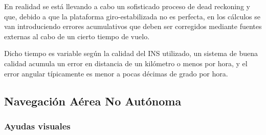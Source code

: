\documentclass[a4paper,12pt,twoside]{article}
\begin{document}
\begin{description}











En realidad se est\'a llevando a cabo un sofisticado proceso de dead reckoning  y que, debido a que la plataforma giro-estabilizada no es perfecta, en los c\'alculos se van introduciendo errores acumulativos que deben ser corregidos mediante fuentes externas al cabo de un cierto tiempo de vuelo.

Dicho tiempo es variable seg\'un la calidad del INS utilizado, un sistema de buena calidad acumula un error en distancia de un kil\'ometro o menos por hora, y el error angular t\'ipicamente es menor a pocas d\'ecimas de grado por hora. 

\end{description}

\subsection{Navegaci\'on A\'erea No Aut\'onoma}

\subsubsection{Ayudas visuales}
\end{document}
